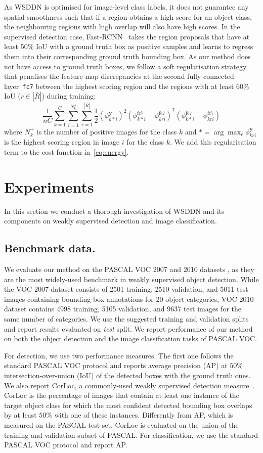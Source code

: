 \documentclass[10pt,twocolumn,letterpaper]{article}
\newcommand{\by}{\mathbf{y}}
\begin{document}
As WSDDN is optimised for image-level class labels, it does not guarantee any spatial smoothness such that if a region obtains a high score for an object class, the neighbouring regions with high overlap will also have high scores. In the supervised detection case, Fast-RCNN~\cite{Girshick15} takes the region proposals that have at least $50 \%$ IoU with a ground truth box as positive samples and learns to regress them into their corresponding ground truth bounding box. As our method does not have access to ground truth boxes, we follow a soft regularisation strategy that penalises the feature map discrepancies at the second fully connected layer~\texttt{fc7} between the highest scoring region and the regions with at least $60 \%$ IoU (\ie\;$r\in|\bar{R}|$) during training:
\[
\frac{1}{nC}
\sum_{k=1}^C
\sum_{i=1}^{N_{k}^+}
\sum_{r=1}^{|\bar{R}|}
\frac{1}{2}(\phi^{\by}_{k*i})^2(\phi^{\text{fc7}}_{k*i}-\phi^{\text{fc7}}_{kri})^{^\mathrm{T}}(\phi^{\text{fc7}}_{k*i}-\phi^{\text{fc7}}_{kri})
\] where $N_{k}^+$ is the number of positive images for the class $k$ and $*=\arg\max_r \phi^{\by}_{kri}$ is the highest scoring region in image $i$ for the class $k$. We add this regularisation term to the cost function in~\cref{eq:energy}. 


\section{Experiments}\label{s:experiments}
In this section we conduct a thorough investigation of WSDDN and its components on weakly supervised detection and image classification.

\subsection{Benchmark data.}
We evaluate our method on the PASCAL VOC 2007 and 2010 datasets \cite{Everingham10}, as they are the most widely-used benchmark in weakly supervised object detection. While the VOC 2007 dataset consists of 2501 training, 2510 validation, and 5011 test images containing bounding box annotations for 20 object categories, VOC 2010 dataset contains 4998 training, 5105 validation, and 9637 test images for the same number of categories. We use the suggested training and validation splits and report results evaluated on \emph{test} split. We report performance of our method on both the object detection and the image classification tasks of PASCAL VOC. 

For detection, we use two performance measures. The first one follows the standard PASCAL VOC protocol and reports average precision (AP) at  $50\%$ intersection-over-union (IoU) of the detected boxes with the ground truth ones. We also report CorLoc, a commonly-used weakly supervised detection measure~\cite{Deselaers12}. CorLoc is the percentage of images that contain at least one instance of the target object class for which the most confident detected bounding box overlaps by at least $50\%$ with one of these instances. Differently from AP, which is measured on the PASCAL test set, CorLoc is evaluated on the union of the training and validation subset of PASCAL. For classification, we use the standard PASCAL VOC protocol and report AP.
\end{document}
